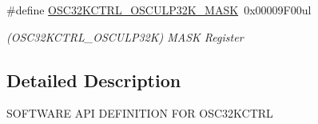 \begin{DoxyCompactItemize}
\item 
\hypertarget{group___s_a_m_l21___o_s_c32_k_c_t_r_l_ga7b3ca0c8a3b7f6e1b9baf3c1da4cd182}{}\#define \hyperlink{group___s_a_m_l21___o_s_c32_k_c_t_r_l_ga7b3ca0c8a3b7f6e1b9baf3c1da4cd182}{O\+S\+C32\+K\+C\+T\+R\+L\+\_\+\+O\+S\+C\+U\+L\+P32\+K\+\_\+\+M\+A\+S\+K}~0x00009\+F00ul\label{group___s_a_m_l21___o_s_c32_k_c_t_r_l_ga7b3ca0c8a3b7f6e1b9baf3c1da4cd182}

\begin{DoxyCompactList}\small\item\em (O\+S\+C32\+K\+C\+T\+R\+L\+\_\+\+O\+S\+C\+U\+L\+P32\+K) M\+A\+S\+K Register \end{DoxyCompactList}\end{DoxyCompactItemize}


\subsection{Detailed Description}
S\+O\+F\+T\+W\+A\+R\+E A\+P\+I D\+E\+F\+I\+N\+I\+T\+I\+O\+N F\+O\+R O\+S\+C32\+K\+C\+T\+R\+L 